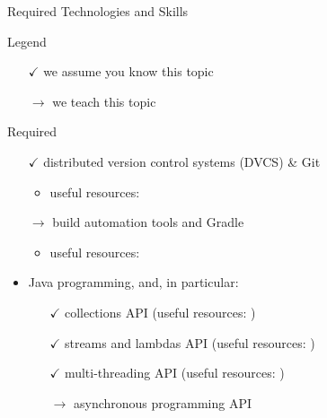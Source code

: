 \documentclass[presentation]{beamer}\mode<presentation>{\usetheme{AMSCesenaPurpleAndGold}}
\begin{document}
\begin{frame}[c,allowframebreaks]{Required Technologies and Skills}

	\begin{block}{Legend}
		\begin{multicols}{2}
			\begin{itemize}
				\item[$\checkmark$] we assume you know this topic
				\item[$\rightarrow$] we teach this topic
			\end{itemize}
		\end{multicols}
	\end{block}

	\begin{alertblock}{Required}
		\begin{itemize}
			\item[$\checkmark$] distributed version control systems (DVCS) \& \alert{Git}
			\begin{itemize}
				\item useful resources: 
			\end{itemize}

			\vfill

			\item[$\rightarrow$] build automation tools and \alert{Gradle}
			\begin{itemize}
				\item useful resources: 
			\end{itemize}

			\vfill

			\item Java programming, and, in particular:
			\begin{itemize}
				\item[$\checkmark$] collections API (useful resources: )
				\item[$\checkmark$] streams and lambdas API (useful resources: )
				\item[$\checkmark$] multi-threading API (useful resources: )
				\item[$\rightarrow$] asynchronous programming API
			\end{itemize}

		\end{itemize}
	\end{alertblock}


\end{frame}
\end{document}
